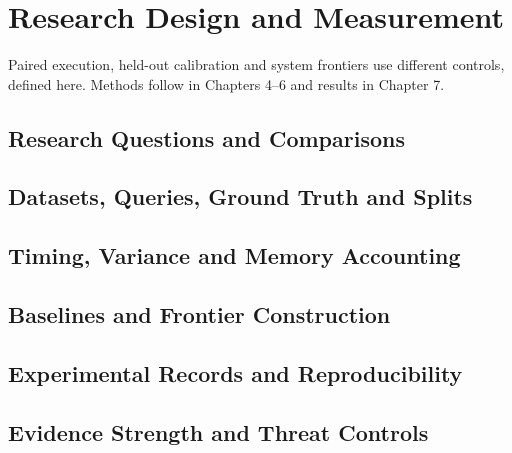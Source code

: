 \chapter{Research Design and Measurement}
\label{ch:methodology}
Paired execution, held-out calibration and system frontiers use different controls, defined here. Methods follow in Chapters 4--6 and results in Chapter 7.

\section{Research Questions and Comparisons}
\label{sec:3-1}


\section{Datasets, Queries, Ground Truth and Splits}
\label{sec:3-2}


\section{Timing, Variance and Memory Accounting}
\label{sec:3-3}


\section{Baselines and Frontier Construction}
\label{sec:3-4}


\section{Experimental Records and Reproducibility}
\label{sec:3-5}


\section{Evidence Strength and Threat Controls}
\label{sec:3-6}

